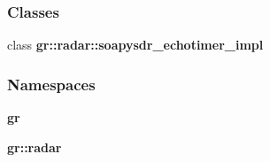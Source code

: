 \subsubsection*{Classes}
\begin{DoxyCompactItemize}
\item 
class {\bf gr\+::radar\+::soapysdr\+\_\+echotimer\+\_\+impl}
\end{DoxyCompactItemize}
\subsubsection*{Namespaces}
\begin{DoxyCompactItemize}
\item 
 {\bf gr}
\item 
 {\bf gr\+::radar}
\end{DoxyCompactItemize}
